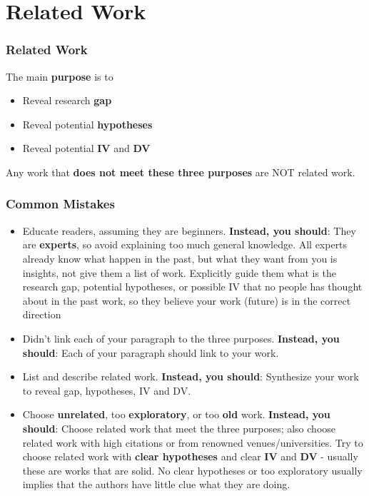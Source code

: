 \documentclass{beamer}
\begin{document}
\section{Related Work}

\begin{frame}
\frametitle{Related Work} 
 The main \textbf{purpose} is to
\begin{itemize}
	\item Reveal research \textbf{gap}
	\item Reveal potential \textbf{hypotheses}
	\item Reveal potential \textbf{IV} and \textbf{DV}
\end{itemize}
Any work that \textbf{does not meet these three purposes} are NOT related work.
\end{frame}

\begin{frame}
\frametitle{Common Mistakes} 
\footnotesize
\begin{itemize}
	\item Educate readers, assuming they are beginners.  \textbf{Instead, you should}:  They are \textbf{experts}, so avoid explaining too much general knowledge.  All experts already know what happen in the past, but what they want from you is insights, not give them a list of work. Explicitly guide them what is the research gap, potential hypotheses, or possible IV that no people has thought about in the past work, so they believe your work (future) is in the correct direction
	\item Didn't link each of your paragraph to the three purposes.   \textbf{Instead, you should}:  Each of your paragraph should link to your work. 
	\item List and describe related work.   \textbf{Instead, you should}:  Synthesize your work to reveal gap, hypotheses, IV and DV.    
	\item Choose \textbf{unrelated},  too \textbf{exploratory}, or too \textbf{old} work.  \textbf{Instead, you should}:  Choose related work that meet the three purposes;  also choose related work with high citations or from renowned venues/universities.   Try to choose related work with \textbf{clear hypotheses} and clear \textbf{IV} and \textbf{DV}  - usually these are works that are solid.   No clear hypotheses or too exploratory usually implies that the authors have little clue what they are doing.
\end{itemize}
\end{frame}
\end{document}
